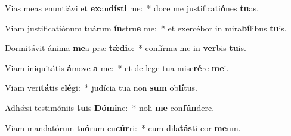 \item Vias meas enuntiávi et \textbf{ex}au\textbf{dís}\textbf{ti} me:~* doce me justificati\textbf{ó}nes \textbf{tu}as.
\item Viam justificatiónum tuárum \textbf{ín}stru\textbf{e} me:~* et exercébor in mira\textbf{bí}libus \textbf{tu}is.
\item Dormitávit ánima \textbf{me}a præ \textbf{tǽ}\textbf{di}o:~* confírma me in \textbf{ver}bis \textbf{tu}is.
\item Viam iniquitátis \textbf{á}move \textbf{a} me:~* et de lege tua mise\textbf{ré}re \textbf{me}i.
\item Viam veri\textbf{tá}tis e\textbf{lé}gi:~* judícia tua non \textbf{sum} ob\textbf{lí}tus.
\item Adhǽsi testimóniis \textbf{tu}is \textbf{Dó}\textbf{mi}ne:~* noli \textbf{me} con\textbf{fún}dere.
\item Viam mandatórum tu\textbf{ó}rum cu\textbf{cúr}ri:~* cum dila\textbf{tás}ti cor \textbf{me}um.
